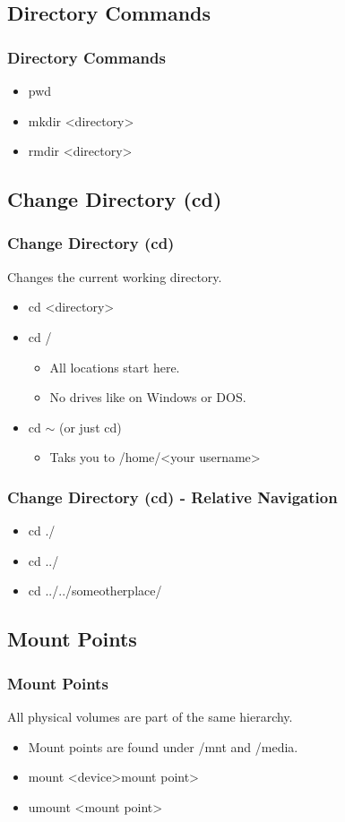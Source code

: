 \documentclass[hyperref={pdfpagelabels=false}]{beamer}
\begin{document}
\subsection{Directory Commands}
\frame
{
    \frametitle{Directory Commands}
    \begin{itemize}
    \item{pwd}
    \item{mkdir {\textless}directory\textgreater\hspace{.5 pc}}
    \item{rmdir {\textless}directory\textgreater\hspace{.5 pc}}
    \end{itemize}
}
\subsection{Change Directory (cd)}
\frame
{
    \frametitle{Change Directory (cd)}
    Changes the current working directory.
    \begin{itemize}
    \item{cd {\textless}directory\textgreater}
    \item{cd /}
        \begin{itemize}
        \item{All locations start here.}
        \item{No drives like on Windows or DOS.}
        \end{itemize}
    \item{cd $\sim$ (or just cd)}
        \begin{itemize}
        \item{Taks you to /home/{\textless}your username\textgreater}
        \end{itemize}
    \end{itemize}
}
\frame
{
    \frametitle{Change Directory (cd) - Relative Navigation}
    \begin{itemize}
    \item{cd ./}
    \item{cd ../}
    \item{cd ../../someotherplace/}
    \end{itemize}
}
\subsection{Mount Points}
\frame
{
    \frametitle{Mount Points}
    All physical volumes are part of the same hierarchy.
    \begin{itemize}
    \item{Mount points are found under /mnt and /media.}
    \item{mount {\textless}device\textgreater\hspace{.5 pc}{\textless}mount point\textgreater\hspace{.5 pc}}
    \item{umount {\textless}mount point\textgreater\hspace{.5 pc}}
    \end{itemize}
}
\end{document}
